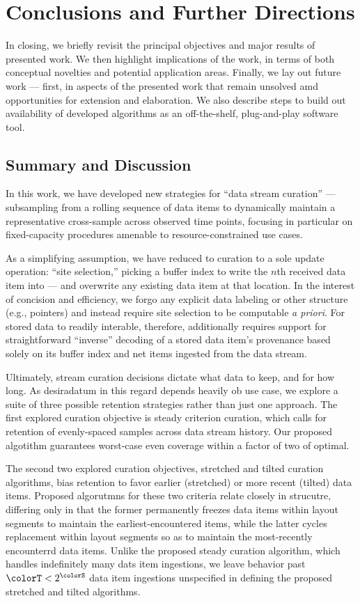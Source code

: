 \section{Conclusions and Further Directions} \label{sec:conclusion}

In closing, we briefly revisit the principal objectives and major results of presented work.
We then highlight implications of the work, in terms of both conceptual novelties and potential application areas.
Finally, we lay out future work --- first, in aspects of the presented work that remain unsolved amd opportunities for extension and elaboration.
We also describe steps to build out availability of developed algorithms as an off-the-shelf, plug-and-play software tool.

\subsection{Summary and Discussion}

In this work, we have developed new strategies for ``data stream curation'' --- subsampling from a rolling sequence of data items to dynamically maintain a representative cross-sample across observed time points, focusing in particular on fixed-capacity procedures amenable to resource-constrained use cases.

As a simplifying assumption, we have reduced to curation to a sole update operation: ``site selection,'' picking a buffer index to write the $n$th received data item into --- and overwrite any existing data item at that location.
In the interest of concision and efficiency, we forgo any explicit data labeling or other structure (e.g., pointers) and instead require
site selection to be computable \textit{a priori}.
For stored data to readily interable, therefore, additionally requires support for straightforward ``inverse'' decoding of a stored data item's provenance based solely on its buffer index and net items ingested from the data stream.

Ultimately, stream curation decisions dictate what data to keep, and for how long.
As desiradatum in this regard depends heavily ob use case, we explore a suite of three possible retention strategies rather than just one approach.
The first explored curation objective is steady criterion curation, which calls for retention of evenly-spaced samples across data stream history.
Our proposed algotithm guarantees worst-case even coverage within a factor of two of optimal.

The second two explored curation objectives, stretched and tilted curation algorithms, bias retention to favor earlier (stretched) or more recent (tilted) data items.
Proposed algorutmns for these two criteria relate closely in strucutre, differing only in that the former permanently freezes data items within layout segments to maintain the earliest-encountered items, while the latter cycles replacement within layout segments so as to maintain the most-recently encounterrd data items.
Unlike the proposed steady curation algorithm, which handles indefinitely many dats item ingestions, we leave behavior past $\colorT < 2^{\colorS}$ data item ingestions unspecified in defining the proposed stretched and tilted algorithms.

